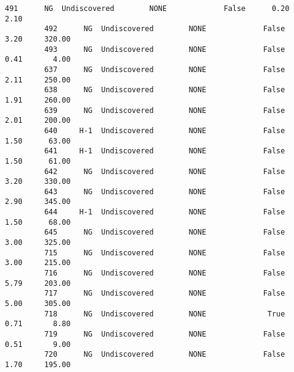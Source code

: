 \documentclass[11pt]{article}
\begin{document}
\begin{Verbatim}[commandchars=\\\{\}]
         491      NG  Undiscovered        NONE             False      0.20       2.10   
         492      NG  Undiscovered        NONE             False      3.20     320.00   
         493      NG  Undiscovered        NONE             False      0.41       4.00   
         637      NG  Undiscovered        NONE             False      2.11     250.00   
         638      NG  Undiscovered        NONE             False      1.91     260.00   
         639      NG  Undiscovered        NONE             False      2.01     200.00   
         640     H-1  Undiscovered        NONE             False      1.50      63.00   
         641     H-1  Undiscovered        NONE             False      1.50      61.00   
         642      NG  Undiscovered        NONE             False      3.20     330.00   
         643      NG  Undiscovered        NONE             False      2.90     345.00   
         644     H-1  Undiscovered        NONE             False      1.50      68.00   
         645      NG  Undiscovered        NONE             False      3.00     325.00   
         715      NG  Undiscovered        NONE             False      3.00     215.00   
         716      NG  Undiscovered        NONE             False      5.79     203.00   
         717      NG  Undiscovered        NONE             False      5.00     305.00   
         718      NG  Undiscovered        NONE              True      0.71       8.80   
         719      NG  Undiscovered        NONE             False      0.51       9.00   
         720      NG  Undiscovered        NONE             False      1.70     195.00   
         

\end{Verbatim}
\end{document}
